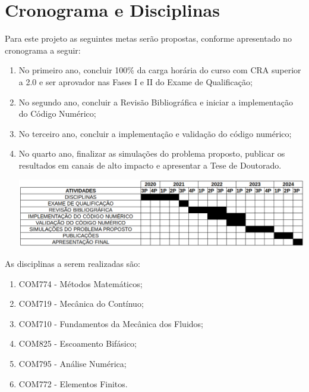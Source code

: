 \section{Cronograma e Disciplinas}
Para este projeto as seguintes metas serão propostas, conforme apresentado no cronograma a seguir:

\begin{enumerate}

\item No primeiro ano, concluir 100\% da carga horária do curso com CRA superior a 2.0 e ser aprovador nas Fases I e II do Exame de Qualificação;

\item No segundo ano, concluir a Revisão Bibliográfica e iniciar a implementação do Código Numérico;

\item No terceiro ano, concluir a implementação e validação do código numérico;

\item No quarto ano, finalizar as simulações do problema proposto, publicar os resultados em canais de alto impacto e apresentar a Tese de Doutorado.

\vspace{0.8cm}
\hspace{-1.2cm}
\includegraphics[scale=0.44]{figure/cronograma.png}

\end{enumerate}

\bigskip
As disciplinas a serem realizadas são:

\begin{enumerate}
\item COM774 - Métodos Matemáticos; 
\item COM719 - Mecânica do Contínuo;
\item COM710 - Fundamentos da Mecânica dos Fluidos;
\item COM825 - Escoamento Bifásico;
\item COM795 - Análise Numérica;
\item COM772 - Elementos Finitos.
\end{enumerate}
